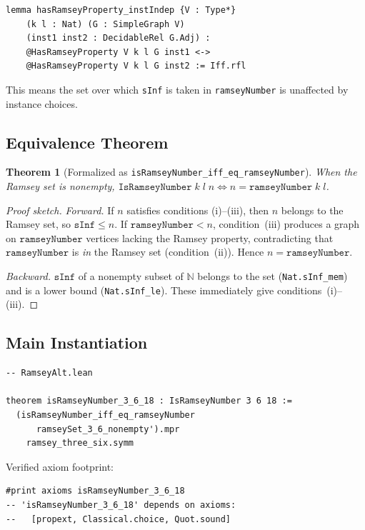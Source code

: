 \documentclass[11pt]{article}
\newtheorem{theorem}{Theorem}[section]
\newcommand{\lean}[1]{\texttt{#1}}
\begin{document}
\begin{lstlisting}
lemma hasRamseyProperty_instIndep {V : Type*}
    (k l : Nat) (G : SimpleGraph V)
    (inst1 inst2 : DecidableRel G.Adj) :
    @HasRamseyProperty V k l G inst1 <->
    @HasRamseyProperty V k l G inst2 := Iff.rfl
\end{lstlisting}

\noindent
This means the set over which \lean{sInf} is taken in
\lean{ramseyNumber} is unaffected by instance choices.

\subsection{Equivalence Theorem}

\begin{theorem}[Formalized as \lean{isRamseyNumber\_iff\_eq\_ramseyNumber}]
When the Ramsey set is nonempty,
$\lean{IsRamseyNumber}\; k\; l\; n \iff n = \lean{ramseyNumber}\; k\; l$.
\end{theorem}

\begin{proof}[Proof sketch]
\emph{Forward.}
If $n$ satisfies conditions (i)--(iii), then $n$ belongs to the Ramsey set,
so $\lean{sInf} \leq n$.
If $\lean{ramseyNumber} < n$, condition~(iii) produces a graph on
$\lean{ramseyNumber}$ vertices lacking the Ramsey property,
contradicting that $\lean{ramseyNumber}$ is \emph{in} the Ramsey set (condition~(ii)).
Hence $n = \lean{ramseyNumber}$.

\emph{Backward.}
$\lean{sInf}$ of a nonempty subset of $\mathbb{N}$ belongs to the set
(\lean{Nat.sInf\_mem}) and is a lower bound (\lean{Nat.sInf\_le}).
These immediately give conditions~(i)--(iii).
\end{proof}

\subsection{Main Instantiation}

\begin{lstlisting}
-- RamseyAlt.lean

theorem isRamseyNumber_3_6_18 : IsRamseyNumber 3 6 18 :=
  (isRamseyNumber_iff_eq_ramseyNumber
      ramseySet_3_6_nonempty').mpr
    ramsey_three_six.symm
\end{lstlisting}

\noindent
Verified axiom footprint:

\begin{lstlisting}
#print axioms isRamseyNumber_3_6_18
-- 'isRamseyNumber_3_6_18' depends on axioms:
--   [propext, Classical.choice, Quot.sound]
\end{lstlisting}
\end{document}
